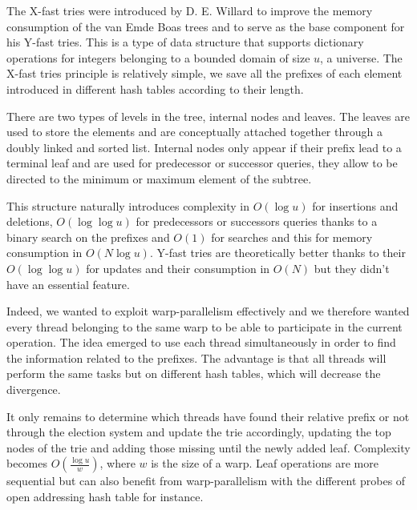 \documentclass[conference]{IEEEtran}
\begin{document}
The X-fast tries were introduced by D. E. Willard to improve the memory consumption of the van Emde Boas trees and to serve as the base component for his Y-fast tries. This is a type of data structure that supports dictionary operations for integers belonging to a bounded domain of size $u$, a universe. The X-fast tries principle is relatively simple, we save all the prefixes of each element introduced in different hash tables according to their length.

There are two types of levels in the tree, internal nodes and leaves. The leaves are used to store the elements and are conceptually attached together through a doubly linked and sorted list. Internal nodes only appear if their prefix lead to a terminal leaf and are used for predecessor or successor queries, they allow to be directed to the minimum or maximum element of the subtree.

This structure naturally introduces complexity in $O(\log u)$ for insertions and deletions, $O(\log \log u)$ for predecessors or successors queries thanks to a binary search on the prefixes and $O(1)$ for searches and this for memory consumption in $O(N \log u)$. Y-fast tries are theoretically better thanks to their $O(\log \log u)$ for updates and their consumption in $O(N)$  but they didn't have an essential feature.

Indeed, we wanted to exploit warp-parallelism effectively and we therefore wanted every thread belonging to the same warp to be able to participate in the current operation. The idea emerged to use each thread simultaneously in order to find the information related to the prefixes. The advantage is that all threads will perform the same tasks but on different hash tables, which will decrease the divergence.

It only remains to determine which threads have found their relative prefix or not through the election system and update the trie accordingly, updating the top nodes of the trie and adding those missing until the newly added leaf. Complexity becomes $O(\frac{\log u}{w})$, where $w$ is the size of a warp. Leaf operations are more sequential but can also benefit from warp-parallelism with the different probes of open addressing hash table for instance.
\end{document}
